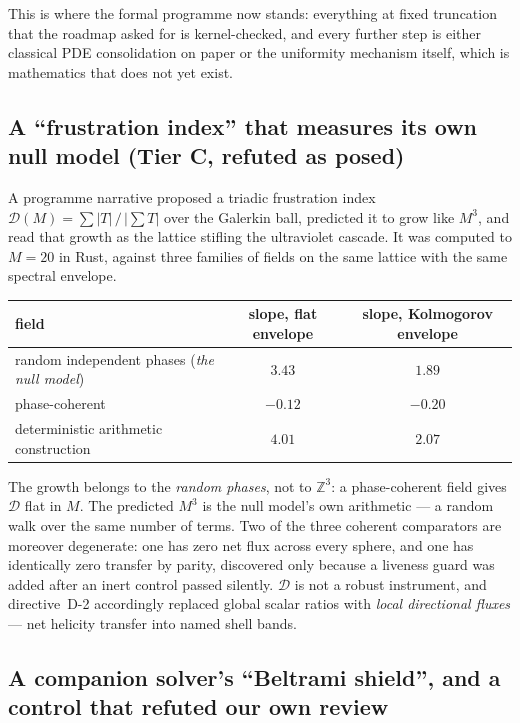 \documentclass[11pt,a4paper]{article}
\newcommand{\tC}{\textcolor{TierC}{\textbf{Tier C}}}
\newcommand{\Z}{\mathbb{Z}}
\theoremstyle{definition}
\theoremstyle{plain}
\begin{document}
This is where the formal programme now stands: everything at fixed truncation that the roadmap
asked for is kernel-checked, and every further step is either classical PDE consolidation on
paper or the uniformity mechanism itself, which is mathematics that does not yet exist.

\subsection{A ``frustration index'' that measures its own null model (\tC{}, refuted as posed)}
\label{sec:frustration}

A programme narrative proposed a triadic frustration index
$\mathcal{D}(M)=\sum|T|\,/\,\bigl|\sum T\bigr|$ over the Galerkin ball, predicted it to grow like
$M^3$, and read that growth as the lattice stifling the ultraviolet cascade. It was computed to
$M=20$ in Rust, against three families of fields on the same lattice with the same spectral
envelope.

\begin{center}
\begin{tabular}{@{}lcc@{}}
\toprule
\textbf{field} & \textbf{slope, flat envelope} & \textbf{slope, Kolmogorov envelope} \\
\midrule
random independent phases (\emph{the null model}) & $3.43$ & $1.89$ \\
phase-coherent & $-0.12$ & $-0.20$ \\
deterministic arithmetic construction & $4.01$ & $2.07$ \\
\bottomrule
\end{tabular}
\end{center}

The growth belongs to the \emph{random phases}, not to $\Z^3$: a phase-coherent field gives
$\mathcal{D}$ flat in $M$. The predicted $M^3$ is the null model's own arithmetic --- a random walk
over the same number of terms. Two of the three coherent comparators are moreover degenerate: one
has zero net flux across every sphere, and one has identically zero transfer by parity, discovered
only because a liveness guard was added after an inert control passed silently. $\mathcal{D}$ is
not a robust instrument, and directive~D-2 accordingly replaced global scalar ratios with
\emph{local directional fluxes} --- net helicity transfer into named shell bands.

\subsection{A companion solver's ``Beltrami shield'', and a control that refuted our own review}
\label{sec:beltrami}
\end{document}
